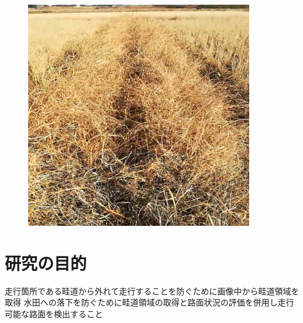 \begin{figure}[htbp]
\begin{center}
\includegraphics[width=100mm]{figs/fig2.jpg}
\caption{}
\end{center}
\end{figure}


\section{研究の目的}
走行箇所である畦道から外れて走行することを防ぐために画像中から畦道領域を取得
水田への落下を防ぐために畦道領域の取得と路面状況の評価を併用し走行可能な路面を検出すること


%
